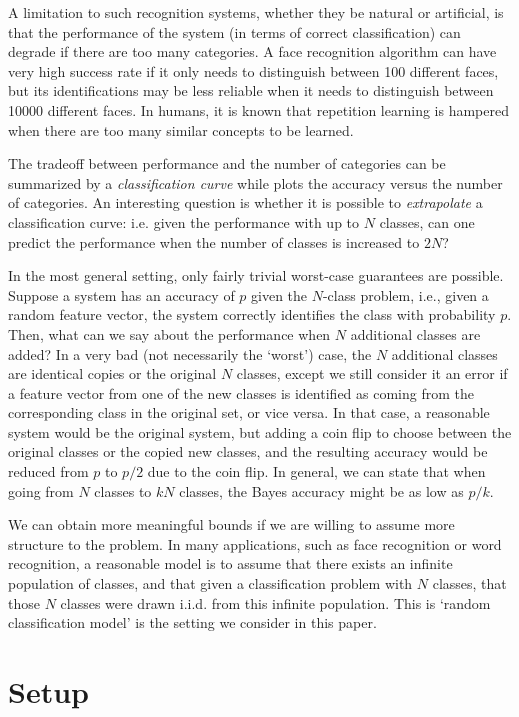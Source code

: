 \documentclass[12pt]{article}
\begin{document}
A limitation to such recognition systems, whether they be natural or artificial,
is that the performance of the system (in terms of correct classification)
can degrade if there are too many categories.
A face recognition algorithm can have very high success rate if it only needs
to distinguish between 100 different faces, but its identifications may be less reliable
when it needs to distinguish between 10000 different faces.
In humans, it is known that repetition learning is hampered when there are
too many similar concepts to be learned.

The tradeoff between performance and the number of categories can be summarized
by a \emph{classification curve} while plots the accuracy versus the number of categories.
An interesting question is whether it is possible to \emph{extrapolate} a classification curve:
i.e. given the performance with up to $N$ classes, can one predict the performance
when the number of classes is increased to $2N$?

In the most general setting, only fairly trivial worst-case guarantees are possible.
Suppose a system has an accuracy of $p$ given the $N$-class problem,
i.e., given a random feature vector, the system correctly identifies the class with probability $p$.
Then, what can we say about the performance when $N$ additional classes are added?
In a very bad (not necessarily the `worst') case, the $N$ additional classes are identical copies
or the original $N$ classes, except we still consider it an error if a feature vector from one of the new classes
is identified as coming from the corresponding class in the original set, or vice versa.
In that case, a reasonable system would be the original system, but adding a coin flip to choose
between the original classes or the copied new classes, and the resulting accuracy would
be reduced from $p$ to $p/2$ due to the coin flip.  In general, we can state that when going from $N$
classes to $kN$ classes, the Bayes accuracy might be as low as $p/k$.

We can obtain more meaningful bounds if we are willing to assume more structure to the problem.
In many applications, such as face recognition or word recognition, a reasonable model
is to assume that there exists an infinite population of classes, and that given a classification problem
with $N$ classes, that those $N$ classes were drawn i.i.d. from this infinite population.
This is `random classification model' is the setting we consider in this paper.

\section{Setup}
\end{document}
